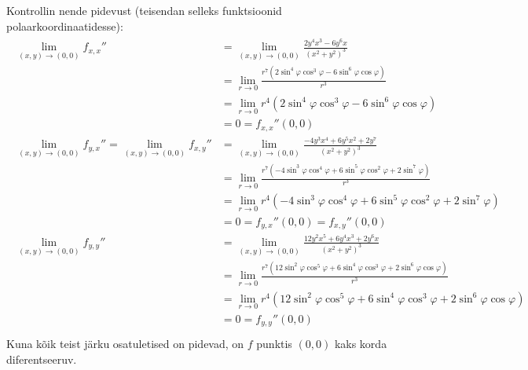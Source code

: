 \documentclass{article}
\begin{document}
Kontrollin nende pidevust (teisendan selleks funktsioonid polaarkoordinaatidesse):
\begin{gather*}
\begin{aligned}
\lim_{(x,y)\to(0,0)}f_{x,x}''&=\lim_{(x,y)\to(0,0)}\frac{2y^4x^3-6y^6x}{(x^2+y^2)^3}\\
&=\lim_{r\to 0}\frac{r^7(2\sin^4\varphi \cos^3\varphi-6\sin^6\varphi\cos\varphi)}{r^3}\\
&=\lim_{r\to 0}r^4(2\sin^4\varphi \cos^3\varphi-6\sin^6\varphi\cos\varphi)\\
&=0=f_{x,x}''(0,0)\\
\lim_{(x,y)\to(0,0)}f_{y,x}''=\lim_{(x,y)\to(0,0)}f_{x,y}''&=\lim_{(x,y)\to(0,0)}\frac{-4y^3x^4+6y^5x^2+2y^7}{(x^2+y^2)^3}\\
&=\lim_{r\to 0}\frac{r^7(-4\sin^3\varphi\cos^4\varphi+6\sin^5\varphi\cos^2\varphi+2\sin^7\varphi)}{r^3}\\
&=\lim_{r\to 0}r^4(-4\sin^3\varphi\cos^4\varphi+6\sin^5\varphi\cos^2\varphi+2\sin^7\varphi)\\
&=0=f_{y,x}''(0,0)=f_{x,y}''(0,0)\\
\lim_{(x,y)\to(0,0)}f_{y,y}''&=\lim_{(x,y)\to(0,0)}\frac{12y^2x^5+6y^4x^3+2y^6x}{(x^2+y^2)^3}\\
&=\lim_{r\to 0}\frac{r^7(12\sin^2\varphi\cos^5\varphi+6\sin^4\varphi\cos^3\varphi+2\sin^6\varphi\cos\varphi)}{r^3}\\
&=\lim_{r\to 0}r^4(12\sin^2\varphi\cos^5\varphi+6\sin^4\varphi\cos^3\varphi+2\sin^6\varphi\cos\varphi)\\
&=0=f_{y,y}''(0,0)\\
\end{aligned}
\end{gather*}
Kuna kõik teist järku osatuletised on pidevad, on $f$ punktis $(0,0)$ kaks korda diferentseeruv.\\
\end{document}
